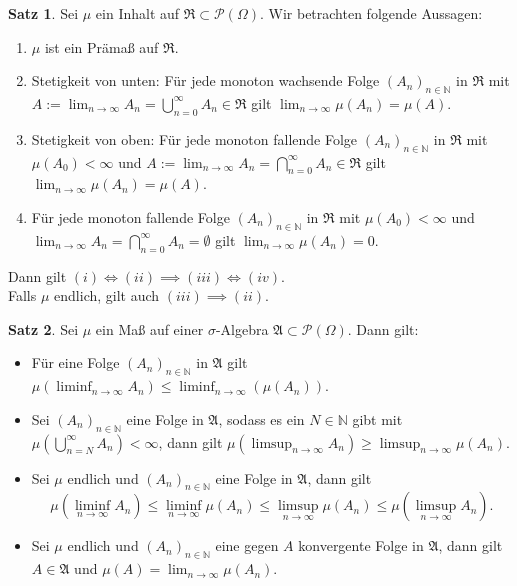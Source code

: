 \documentclass[a4paper,10pt,landscape]{article}
\newcommand{\N}{\mathbb{N}}
\newcommand{\PS}{\mathcal{P}} %
\newcommand{\PSO}{\PS(\Omega)} %
\newcommand{\Alg}{\mathfrak{A}}
\newcommand{\Ring}{\mathfrak{R}}
\theoremstyle{definition}
\newtheorem*{satz}{Satz}
\theoremstyle{remark}
\begin{document}
\begin{multicols}{3}
\begin{satz}
  Sei $\mu$ ein Inhalt auf $\Ring \subset \PSO$. Wir betrachten folgende Aussagen:

  \begin{enumerate}[label=(\roman*),leftmargin=2em]
    \item $\mu$ ist ein Prämaß auf $\Ring$.
    \item Stetigkeit von unten: Für jede monoton wachsende Folge $(A_n)_{n \in \N}$ in $\Ring$ mit $A := \lim_{n \to \infty} A_n = \bigcup_{n = 0}^\infty A_n \in \Ring$ gilt $\lim_{n \to \infty} \mu(A_n) = \mu(A)$.
    \item Stetigkeit von oben: Für jede monoton fallende Folge $(A_n)_{n \in \N}$ in $\Ring$ mit $\mu(A_0) < \infty$ und $A := \lim_{n \to \infty} A_n = \bigcap_{n = 0}^\infty A_n \in \Ring$ gilt $\lim_{n \to \infty} \mu(A_n) = \mu(A)$.
    \item Für jede monoton fallende Folge $(A_n)_{n \in \N}$ in $\Ring$ mit $\mu(A_0) < \infty$ und $\lim_{n \to \infty} A_n = \bigcap_{n = 0}^\infty A_n = \emptyset$ gilt $\lim_{n \to \infty} \mu(A_n) = 0$.
  \end{enumerate}

  Dann gilt $(i) \iff (ii) \implies (iii) \iff (iv)$.\\
  Falls $\mu$ endlich, gilt auch $(iii) \implies (ii)$.
\end{satz}

\begin{satz}
  Sei $\mu$ ein Maß auf einer $\sigma$-Algebra $\Alg \subset \PSO$. Dann gilt:
  \begin{itemize}
    \item Für eine Folge $(A_n)_{n \in \N}$ in $\Alg$ gilt $\mu\left(\liminf_{n \to \infty} A_n\right) \leq \liminf_{n \to \infty}(\mu(A_n))$.
    \item Sei $(A_n)_{n \in \N}$ eine Folge in $\Alg$, sodass es ein $N \in \N$ gibt mit $\mu\left(\bigcup_{n = N}^\infty A_n \right) < \infty$, dann gilt $\mu\left(\limsup_{n \to \infty} A_n \right) \geq \limsup_{n \to \infty} \mu(A_n)$.
    \item Sei $\mu$ endlich und $(A_n)_{n \in \N}$ eine Folge in $\Alg$, dann gilt
    \[ \mu\left(\liminf_{n \to \infty} A_n\right) \leq \liminf_{n \to \infty} \mu(A_n) \leq \limsup_{n \to \infty} \mu(A_n) \leq \mu\left(\limsup_{n \to \infty} A_n\right). \]
    \item Sei $\mu$ endlich und $(A_n)_{n \in \N}$ eine gegen $A$ konvergente Folge in $\Alg$, dann gilt $A \in \Alg$ und $\mu(A) = \lim_{n \to \infty} \mu(A_n)$.
  \end{itemize}
\end{satz}


\end{multicols}
\end{document}
